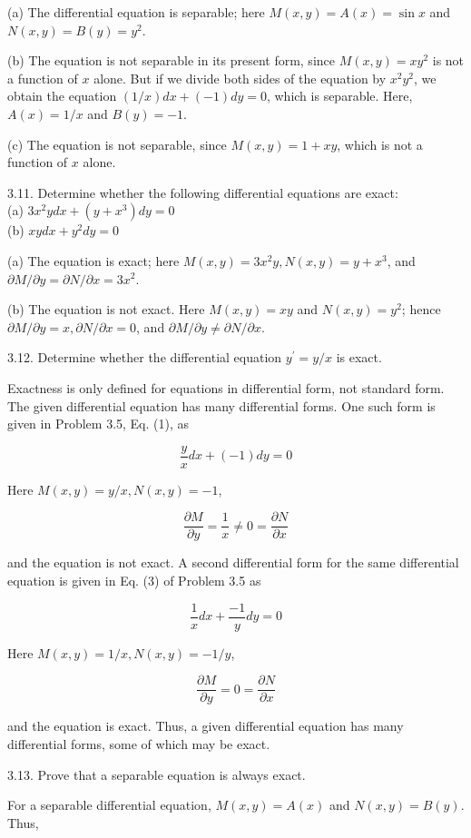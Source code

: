 \documentclass[10pt]{article}
\begin{document}
(a) The differential equation is separable; here $M(x, y)=A(x)=\sin x$ and $N(x, y)=B(y)=y^{2}$.

(b) The equation is not separable in its present form, since $M(x, y)=x y^{2}$ is not a function of $x$ alone. But if we divide both sides of the equation by $x^{2} y^{2}$, we obtain the equation $(1 / x) d x+(-1) d y=0$, which is separable. Here, $A(x)=1 / x$ and $B(y)=-1$.

(c) The equation is not separable, since $M(x, y)=1+x y$, which is not a function of $x$ alone.

3.11. Determine whether the following differential equations are exact:\\
(a) $3 x^{2} y d x+\left(y+x^{3}\right) d y=0$\\
(b) $x y d x+y^{2} d y=0$

(a) The equation is exact; here $M(x, y)=3 x^{2} y, N(x, y)=y+x^{3}$, and $\partial M / \partial y=\partial N / \partial x=3 x^{2}$.

(b) The equation is not exact. Here $M(x, y)=x y$ and $N(x, y)=y^{2}$; hence $\partial M / \partial y=x, \partial N / \partial x=0$, and $\partial M / \partial y \neq \partial N / \partial x$.

3.12. Determine whether the differential equation $y^{\prime}=y / x$ is exact.

Exactness is only defined for equations in differential form, not standard form. The given differential equation has many differential forms. One such form is given in Problem 3.5, Eq. (1), as

$$
\frac{y}{x} d x+(-1) d y=0
$$

Here $M(x, y)=y / x, N(x, y)=-1$,

$$
\frac{\partial M}{\partial y}=\frac{1}{x} \neq 0=\frac{\partial N}{\partial x}
$$

and the equation is not exact. A second differential form for the same differential equation is given in Eq. (3) of Problem 3.5 as

$$
\frac{1}{x} d x+\frac{-1}{y} d y=0
$$

Here $M(x, y)=1 / x, N(x, y)=-1 / y$,

$$
\frac{\partial M}{\partial y}=0=\frac{\partial N}{\partial x}
$$

and the equation is exact. Thus, a given differential equation has many differential forms, some of which may be exact.

3.13. Prove that a separable equation is always exact.

For a separable differential equation, $M(x, y)=A(x)$ and $N(x, y)=B(y)$. Thus,
\end{document}
